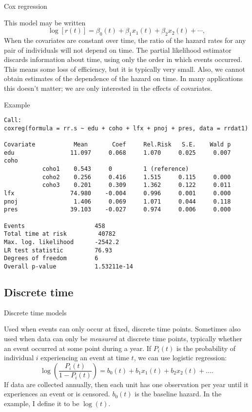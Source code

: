 \documentclass[10pt,ignorenonframetext,]{beamer}
\begin{document}
\begin{frame}{Cox regression}

This model may be written \[
\log[r(t)] = \beta_0(t) + \beta_1 x_1(t) + \beta_2 x_2(t) + \cdots,
\] When the covariates are constant over time, the ratio of the hazard
rates for any pair of individuals will not depend on time. The partial
likelihood estimator discards information about time, using only the
order in which events occurred. This means some loss of efficiency, but
it is typically very small. Also, we cannot obtain estimates of the
dependence of the hazard on time. In many applications this doesn't
matter; we are only interested in the effects of covariates.

\end{frame}

\begin{frame}[fragile]{Example}

\scriptsize

\begin{verbatim}
Call:
coxreg(formula = rr.s ~ edu + coho + lfx + pnoj + pres, data = rrdat1)

Covariate           Mean       Coef     Rel.Risk   S.E.    Wald p
edu                11.097     0.068     1.070     0.025     0.007 
coho 
           coho1    0.543     0         1 (reference)
           coho2    0.256     0.416     1.515     0.115     0.000 
           coho3    0.201     0.309     1.362     0.122     0.011 
lfx                74.980    -0.004     0.996     0.001     0.000 
pnoj                1.406     0.069     1.071     0.044     0.118 
pres               39.103    -0.027     0.974     0.006     0.000 

Events                    458 
Total time at risk         40782 
Max. log. likelihood      -2542.2 
LR test statistic         76.93 
Degrees of freedom        6 
Overall p-value           1.53211e-14
\end{verbatim}

\end{frame}

\subsection{Discrete time}\label{discrete-time}

\begin{frame}{Discrete time models}

Used when events can only occur at fixed, discrete time points.
Sometimes also used when data can only be \emph{measured} at discrete
time points, typically whether an event occurred at some point during a
year. If \(P_i(t)\) is the probability of individual \(i\) experiencing
an event at time \(t\), we can use logistic regression: \[
\log\left(\frac{P_i(t)}{1-P_i(t)}\right) = b_0(t) + b_1 x_1(t) + b_2
x_2(t) + \dots.
\] If data are collected annually, then each unit has one observation
per year until it experiences an event or is censored. \(b_0(t)\) is the
baseline hazard. In the example, I define it to be \(\log(t).\)

\end{frame}
\end{document}
